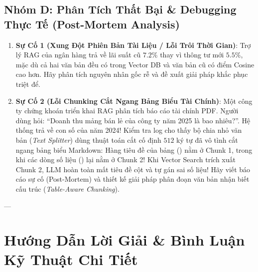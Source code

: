 \subsection{Nhóm D: Phân Tích Thất Bại \& Debugging Thực Tế (Post-Mortem Analysis)}
\begin{enumerate}
  \item \textbf{Sự Cố 1 (Xung Đột Phiên Bản Tài Liệu / Lỗi Trôi Thời Gian)}:
  Trợ lý RAG của ngân hàng trả về lãi suất cũ $7.2\%$ thay vì thông tư mới $5.5\%$, mặc dù cả hai văn bản đều có trong Vector DB và văn bản cũ có điểm Cosine cao hơn. Hãy phân tích nguyên nhân gốc rễ và đề xuất giải pháp khắc phục triệt để.

  \item \textbf{Sự Cố 2 (Lỗi Chunking Cắt Ngang Bảng Biểu Tài Chính)}:
  Một công ty chứng khoán triển khai RAG phân tích báo cáo tài chính PDF. Người dùng hỏi: ``Doanh thu mảng bán lẻ của công ty năm 2025 là bao nhiêu?''. Hệ thống trả về con số của năm 2024!
  Kiểm tra log cho thấy bộ chia nhỏ văn bản (\textit{Text Splitter}) dùng thuật toán cắt cố định $512$ ký tự đã vô tình cắt ngang bảng biểu Markdown: Hàng tiêu đề của bảng () nằm ở Chunk 1, trong khi các dòng số liệu () lại nằm ở Chunk 2! Khi Vector Search trích xuất Chunk 2, LLM hoàn toàn mất tiêu đề cột và tự gán sai số liệu!
  Hãy viết báo cáo sự cố (Post-Mortem) và thiết kế giải pháp phân đoạn văn bản nhận biết cấu trúc (\textit{Table-Aware Chunking}).
\end{enumerate}

---

\section{Hướng Dẫn Lời Giải \& Bình Luận Kỹ Thuật Chi Tiết}
\label{sec:ch08-solutions}

